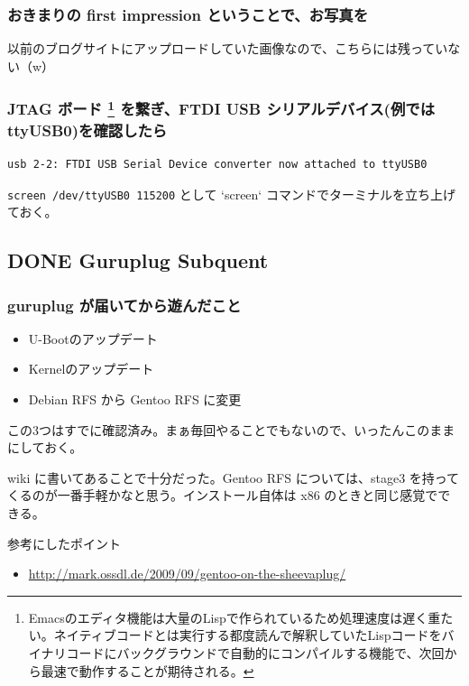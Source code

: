 \documentclass[11pt]{article}
\begin{document}
\subsubsection{おきまりの first impression ということで、お写真を}
\label{sec:org670a2bc}
以前のブログサイトにアップロードしていた画像なので、こちらには残っていない（w）
\subsubsection[JTAG ボード を繋ぎ、FTDI USB シリアルデバイス(例ではttyUSB0)を確認したら]{JTAG ボード \footnote{Emacsのエディタ機能は大量のLispで作られているため処理速度は遅く重たい。ネイティブコードとは実行する都度読んで解釈していたLispコードをバイナリコードにバックグラウンドで自動的にコンパイルする機能で、次回から最速で動作することが期待される。\label{org3132e76}} を繋ぎ、FTDI USB シリアルデバイス(例ではttyUSB0)を確認したら}
\label{sec:orgb38f801}
\begin{verbatim}
usb 2-2: FTDI USB Serial Device converter now attached to ttyUSB0
\end{verbatim}

\texttt{screen /dev/ttyUSB0 115200} として `screen` コマンドでターミナルを立ち上げておく。
\subsection{{\bfseries\sffamily DONE} Guruplug Subquent}
\label{sec:org0671de9}
\subsubsection{guruplug が届いてから遊んだこと}
\label{sec:org90ccdc3}
\begin{itemize}
\item U-Bootのアップデート
\item Kernelのアップデート
\item Debian RFS から Gentoo RFS に変更
\end{itemize}

この3つはすでに確認済み。まぁ毎回やることでもないので、いったんこのままにしておく。

wiki に書いてあることで十分だった。Gentoo RFS については、stage3 を持ってくるのが一番手軽かなと思う。インストール自体は x86 のときと同じ感覚でできる。

参考にしたポイント

\begin{itemize}
\item \url{http://mark.ossdl.de/2009/09/gentoo-on-the-sheevaplug/}
\end{itemize}
\end{document}
